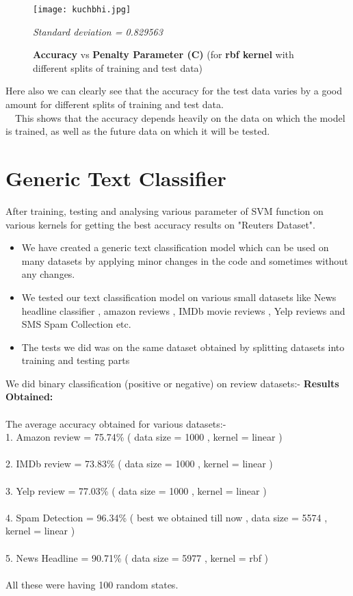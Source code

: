 \documentclass{report}
\begin{document}
\begin{figure}[!h]
  \texttt{[image: kuchbhi.jpg]}
  \caption{\textbf{Accuracy }vs\textbf{ Penalty Parameter (C)} (for \textbf{rbf kernel} with different splits of training and test data)}
  \label{fig:}
  \emph{\normalsize Standard deviation = 0.829563}
\end{figure}

Here also we can clearly see that the accuracy for the test data varies by a good amount for different splits of training and test data.\\
\linebreak
\ \ This shows that the accuracy depends heavily on the data on which the model is trained, as well as the future data on which it will be tested. 
\pagebreak

\section{\Huge Generic Text Classifier}
\Large
After training, testing and analysing various parameter of SVM function on various kernels for getting the best accuracy results on "Reuters Dataset".

\begin{itemize}
\item We have created a generic text classification model which can be used on many datasets by applying minor changes in the code and sometimes without any changes.
\item We tested our text classification model on various small datasets like News headline classifier \cite{news_headline}, amazon reviews \cite{Lichman:2013}, IMDb movie reviews \cite{Lichman:2013}, Yelp reviews \cite{Lichman:2013} and SMS Spam Collection \cite{sms_spam} etc.

\item The tests we did was on the same dataset obtained by splitting datasets into training and testing parts
\end{itemize}
We did binary classification (positive or negative) on review datasets:-
\linebreak \linebreak
\textbf{\LARGE Results Obtained:}\\ \\
The average accuracy obtained for various datasets:-\\
\linebreak
\Large
1. Amazon review = 75.74\% ( data size = 1000 , kernel = linear )\\ \\
2. IMDb review = 73.83\% ( data size = 1000 , kernel = linear )\\ \\
3. Yelp review = 77.03\% ( data size = 1000 , kernel = linear )\\ \\
4. Spam Detection = 96.34\% ( best we obtained till now , data size = 5574 , kernel = linear )\\ \\
5. News Headline = 90.71\% ( data size = 5977 , kernel = rbf )\\ \\
All these were having 100 random states.
\pagebreak
\end{document}
